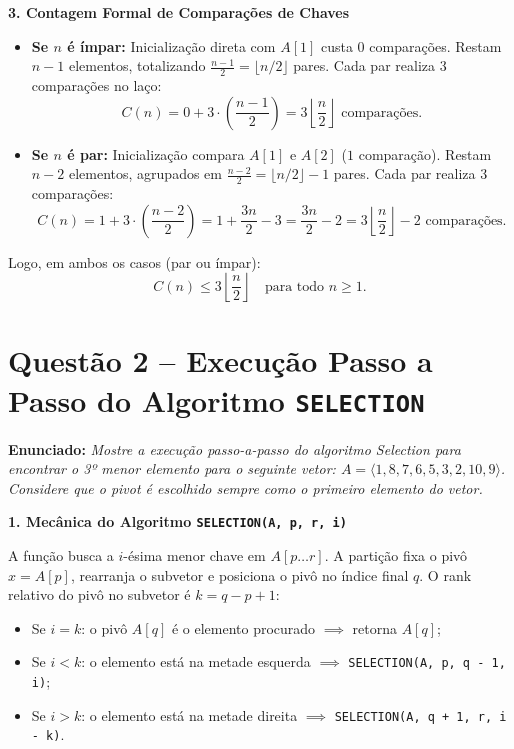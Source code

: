 \documentclass[10pt,a4paper]{article}
\newcommand{\resmath}[1]{\[\boxed{#1}\]}
\newcommand{\topico}[1]{\smallskip\noindent\textbf{\color{azul}#1}\par}
\newcommand{\questao}[2]{\section*{\large\color{azul}Questão #1 -- #2}\vspace{-4pt}}
\begin{document}
\topico{3. Contagem Formal de Comparações de Chaves}
\begin{itemize}
    \setlength{\itemsep}{1pt}
    \item \textbf{Se $n$ é ímpar:} Inicialização direta com $A[1]$ custa $0$ comparações. Restam $n-1$ elementos, totalizando $\frac{n-1}{2} = \lfloor n/2 \rfloor$ pares. Cada par realiza 3 comparações no laço:
    \[
    C(n) = 0 + 3 \cdot \left(\frac{n-1}{2}\right) = 3\left\lfloor \frac{n}{2} \right\rfloor \text{ comparações.}
    \]
    \item \textbf{Se $n$ é par:} Inicialização compara $A[1]$ e $A[2]$ ($1$ comparação). Restam $n-2$ elementos, agrupados em $\frac{n-2}{2} = \lfloor n/2 \rfloor - 1$ pares. Cada par realiza 3 comparações:
    \[
    C(n) = 1 + 3 \cdot \left(\frac{n-2}{2}\right) = 1 + \frac{3n}{2} - 3 = \frac{3n}{2} - 2 = 3\left\lfloor \frac{n}{2} \right\rfloor - 2 \text{ comparações.}
    \]
\end{itemize}
Logo, em ambos os casos (par ou ímpar):
\resmath{C(n) \le 3\left\lfloor \frac{n}{2} \right\rfloor \quad \text{para todo } n \ge 1.}

\clearpage
\questao{2}{Execução Passo a Passo do Algoritmo \texttt{SELECTION}}

\textbf{Enunciado:} \textit{Mostre a execução passo-a-passo do algoritmo Selection para encontrar o 3º menor elemento para o seguinte vetor: $A = \langle 1, 8, 7, 6, 5, 3, 2, 10, 9 \rangle$. Considere que o pivot é escolhido sempre como o primeiro elemento do vetor.}

\topico{1. Mecânica do Algoritmo \texttt{SELECTION(A, p, r, i)}}
A função busca a $i$-ésima menor chave em $A[p \dots r]$. A partição fixa o pivô $x = A[p]$, rearranja o subvetor e posiciona o pivô no índice final $q$. O rank relativo do pivô no subvetor é $k = q - p + 1$:
\begin{itemize}
    \setlength{\itemsep}{0pt}
    \item Se $i = k$: o pivô $A[q]$ é o elemento procurado $\implies$ retorna $A[q]$;
    \item Se $i < k$: o elemento está na metade esquerda $\implies$ \texttt{SELECTION(A, p, q - 1, i)};
    \item Se $i > k$: o elemento está na metade direita $\implies$ \texttt{SELECTION(A, q + 1, r, i - k)}.
\end{itemize}
\end{document}
